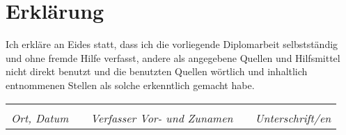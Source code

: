 

\chapter*{Erklärung}



Ich erkläre an Eides statt, dass ich die vorliegende Diplomarbeit selbstständig und ohne fremde Hilfe verfasst, andere als angegebene Quellen und Hilfsmittel nicht direkt benutzt und die benutzten Quellen wörtlich und inhaltlich entnommenen Stellen als solche erkenntlich gemacht habe.
\vspace{3cm}

\begin{tabularx}{1\textwidth}{X p{1cm} X p{1cm} X}


\hrulefill & & \hrulefill & & \hrulefill \\
\emph{Ort, Datum} & & \emph{Verfasser Vor- und Zunamen} & & \emph{Unterschrift/en}
\end{tabularx}


